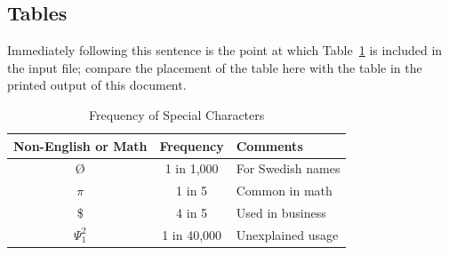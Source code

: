 \documentclass[sigconf]{acmart}
\begin{document}
\begin{itemize}
\section{Tables}


Immediately following this sentence is the point at which
Table~\ref{tab:freq} is included in the input file; compare the
placement of the table here with the table in the printed output of
this document.

\begin{table}
  \caption{Frequency of Special Characters}
  \label{tab:freq}
  \begin{tabular}{ccl}
    \toprule
    Non-English or Math&Frequency&Comments\\
    \midrule
    \O & 1 in 1,000& For Swedish names\\
    $\pi$ & 1 in 5& Common in math\\
    \$ & 4 in 5 & Used in business\\
    $\Psi^2_1$ & 1 in 40,000& Unexplained usage\\
  \bottomrule
\end{tabular}
\end{table}


\end{itemize}
\end{document}
